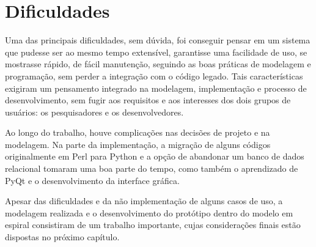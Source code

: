 \section{Dificuldades} \label{sec:dificuldades}

Uma das principais dificuldades, sem dúvida, foi conseguir pensar em um sistema que pudesse ser ao mesmo tempo extensível, garantisse uma facilidade de uso,
se mostrasse rápido, de fácil manutenção, seguindo as boas práticas de modelagem e programação, sem perder a integração com o código legado. Tais
características exigiram um pensamento integrado na modelagem, implementação e processo de desenvolvimento, sem fugir aos requisitos e aos interesses dos dois
grupos de usuários: os pesquisadores e os desenvolvedores.

Ao longo do trabalho, houve complicações nas decisões de projeto e na modelagem. Na parte da implementação, a migração de alguns códigos originalmente em Perl
para Python e a opção de abandonar um banco de dados relacional tomaram uma boa parte do tempo, como também o aprendizado de PyQt e o desenvolvimento da
interface gráfica.

Apesar das dificuldades e da não implementação de alguns casos de uso, a modelagem realizada e o desenvolvimento do protótipo dentro do modelo em espiral
consistiram de um trabalho importante, cujas considerações finais estão dispostas no próximo capítulo.